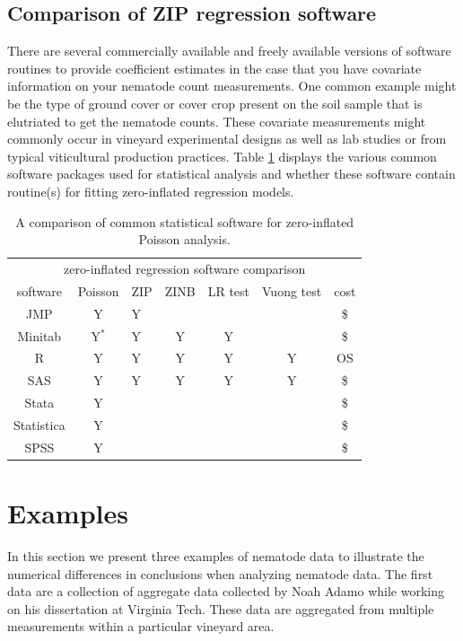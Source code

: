 \documentclass{article}
\begin{document}
\subsection{Comparison of ZIP regression software}\label{sec:zip_soft}
There are several commercially available and freely available versions of software routines to provide coefficient estimates in the case that you have covariate information on your nematode count measurements. One common example might be the type of ground cover or cover crop present on the soil sample that is elutriated to get the nematode counts. These covariate measurements might commonly occur in vineyard experimental designs as well as lab studies or from typical viticultural production practices. Table \ref{tab:software} displays the various common software packages used for statistical analysis and whether these software contain routine(s) for fitting zero-inflated regression models. 

\begin{table}
 \label{tab:software}
\begin{center}
\begin{tabular}{c | c l c | c | c | c  }
\hline
\multicolumn{7}{c}{zero-inflated regression software comparison} \\
\cline{1-7}
software & Poisson & ZIP  & ZINB & LR test & Vuong test & cost \\
\hline
JMP & Y  & Y & & & & \$ \\
Minitab & Y$^*$ &Y &Y  & Y&& \$ \\
R & Y  & Y & Y& Y&Y& OS \\
SAS & Y & Y & Y& Y&Y& \$ \\
Stata & Y &  & & & & \$ \\
Statistica & Y &  & & & & \$ \\
SPSS & Y &  & & && \$ \\
\hline
\end{tabular}
\end{center}
\caption{A comparison of common statistical software for zero-inflated Poisson analysis. }
\end{table}

\section{Examples}\label{sec:examples}
In this section we present three examples of nematode data to illustrate the numerical differences in conclusions when analyzing nematode data. The first data are a collection of aggregate data collected by Noah Adamo while working on his dissertation at Virginia Tech. These data are aggregated from multiple measurements within a particular vineyard area. 
\end{document}
